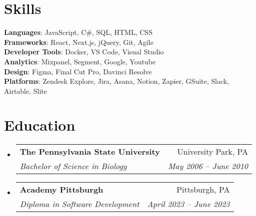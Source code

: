 \documentclass[letterpaper,11pt]{article}
\makeatletter
\newcommand{\resumeSubheading}[4]{
  \vspace{-2pt}\item
    \begin{tabular*}{0.97\textwidth}[t]{l@{\extracolsep{\fill}}r}
      \textbf{#1} & #2 \\
      \textit{\small#3} & \textit{\small #4} \\
    \end{tabular*}\vspace{-7pt}
}
\newcommand{\resumeSubHeadingListStart}{\begin{itemize}[leftmargin=0.15in, label={}]}
\newcommand{\resumeSubHeadingListEnd}{\end{itemize}}
\makeatother
\begin{document}
\section{Skills}
\begin{itemize}[leftmargin=0.15in, label={}]
    \small{
      \item{
      \textbf{Languages}{: JavaScript, C\#, SQL, HTML, CSS} \\
      \textbf{Frameworks}{: React, Next.js, jQuery, Git, Agile} \\
      \textbf{Developer Tools}{: Docker, VS Code, Visual Studio} \\
      \textbf{Analytics}{: Mixpanel, Segment, Google, Youtube} \\
      \textbf{Design}{: Figma, Final Cut Pro, Davinci Resolve} \\
      \textbf{Platforms}{: Zendesk Explore, Jira, Asana, Notion, Zapier, GSuite, Slack, Airtable, Slite} \\
      }
    }
  \end{itemize}
  
  \section{Education}
    \resumeSubHeadingListStart
      \resumeSubheading
        {The Pennsylvania State University}{University Park, PA}
        {Bachelor of Science in Biology}{May 2006 -- June 2010}
      \resumeSubheading
        {Academy Pittsburgh}{Pittsburgh, PA}
        {Diploma in Software Development}{April 2023 -- June 2023}
    \resumeSubHeadingListEnd

  
\end{document}
